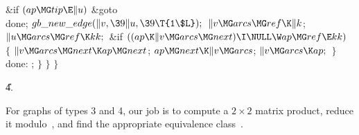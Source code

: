 \1\6
\&{if} ${}(\\{ap}\MG\\{tip}\E\|u){}$\1\5
\&{goto} \\{done};\2%
\2\2\6
${}\\{gb\_new\_edge}(\|v,\39\|u,\39\T{1\$L});{}$\6
${}\|v\MG\\{arcs}\MG\\{ref}\K\|k{}$;\5
${}\|u\MG\\{arcs}\MG\\{ref}\K\\{kk};{}$\6
\&{if} ${}((\\{ap}\K\|v\MG\\{arcs}\MG\\{next})\I\NULL\W\\{ap}\MG\\{ref}\E%
\\{kk}){}$\5
${}\{{}$\1\6
${}\|v\MG\\{arcs}\MG\\{next}\K\\{ap}\MG\\{next}{}$;\5
${}\\{ap}\MG\\{next}\K\|v\MG\\{arcs}{}$;\5
${}\|v\MG\\{arcs}\K\\{ap};{}$\6
\4${}\}{}$\2\6
\4\\{done}:\5
;\6
\4${}\}{}$\2\6
\4${}\}{}$\2\2\6
\4${}\}{}$\2\par
\U4.\fi

For graphs of types 3 and 4, our job is to compute a $2\times2$ matrix
product, reduce it modulo~, and find the appropriate
equivalence class~.

